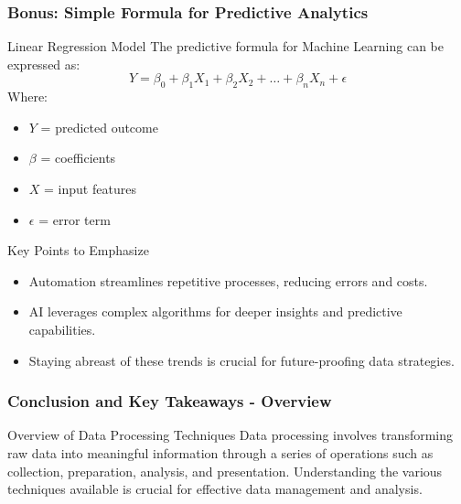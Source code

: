 \documentclass[aspectratio=169]{beamer}
\begin{document}
\begin{frame}[fragile]
    \frametitle{Bonus: Simple Formula for Predictive Analytics}
    \begin{block}{Linear Regression Model}
    The predictive formula for Machine Learning can be expressed as:
    \begin{equation}
    Y = \beta_0 + \beta_1 X_1 + \beta_2 X_2 + \ldots + \beta_n X_n + \epsilon
    \end{equation}
    Where:
    \begin{itemize}
        \item $Y$ = predicted outcome
        \item $\beta$ = coefficients
        \item $X$ = input features
        \item $\epsilon$ = error term
    \end{itemize}
    \end{block}

    \begin{block}{Key Points to Emphasize}
    \begin{itemize}
        \item Automation streamlines repetitive processes, reducing errors and costs.
        \item AI leverages complex algorithms for deeper insights and predictive capabilities.
        \item Staying abreast of these trends is crucial for future-proofing data strategies.
    \end{itemize}
    \end{block}
\end{frame}

\begin{frame}[fragile]
  \frametitle{Conclusion and Key Takeaways - Overview}
  \begin{block}{Overview of Data Processing Techniques}
    Data processing involves transforming raw data into meaningful information through a series of operations such as collection, preparation, analysis, and presentation. Understanding the various techniques available is crucial for effective data management and analysis.
  \end{block}
\end{frame}
\end{document}
